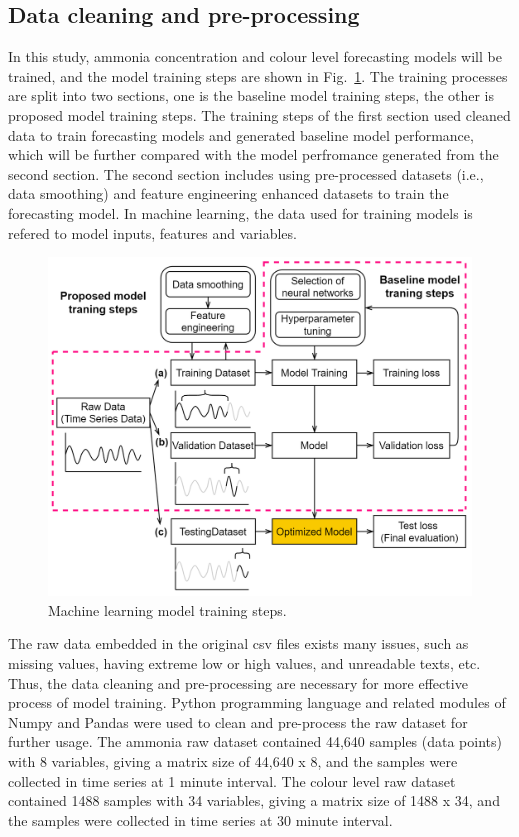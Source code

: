 \subsection{Data cleaning and pre-processing}
In this study, ammonia concentration and colour level forecasting models will be trained, and the model training steps are shown in Fig.~\ref{fig:training-scheme}. The training processes are split into two sections, one is the baseline model training steps, the other is proposed model training steps. The training steps of the first section used cleaned data to train forecasting models and generated baseline model performance, which will be further compared with the model perfromance generated from the second section. The second section includes using pre-processed datasets (i.e., data smoothing) and feature engineering enhanced datasets to train the forecasting model. In machine learning, the data used for training models is refered to model inputs, features and variables.

\begin{figure}[h]
    \centering
    \includegraphics[width=0.9\columnwidth]{imgs/pre-processing/training-scheme.png}
    \caption{Machine learning model training steps.}
    \label{fig:training-scheme}
\end{figure}

The raw data embedded in the original csv files exists many issues, such as missing values, having extreme low or high values, and unreadable texts, etc. Thus, the data cleaning and pre-processing are necessary for more effective process of model training. Python programming language and related modules of Numpy and Pandas were used to clean and pre-process the raw dataset for further usage. The ammonia raw dataset contained 44,640 samples (data points) with 8 variables, giving a matrix size of 44,640 x 8, and the samples were collected in time series at 1 minute interval. The colour level raw dataset contained 1488 samples with 34 variables, giving a matrix size of 1488 x 34, and the samples were collected in time series at 30 minute interval.

